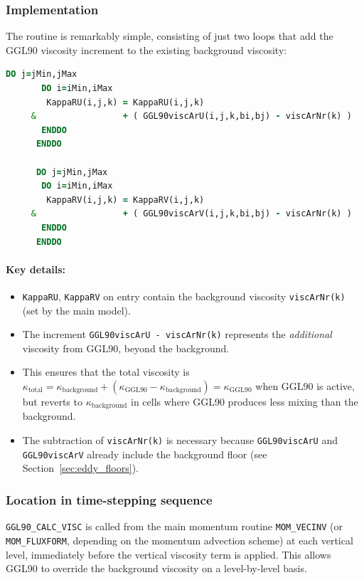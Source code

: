 \documentclass[12pt,letterpaper]{article}
\begin{document}
\subsubsection{Implementation}

The routine is remarkably simple, consisting of just two loops that add the GGL90 viscosity increment to the existing background viscosity:

\begin{lstlisting}[language=Fortran,caption={(ggl90\_calc\_visc.F:L47--59) Add GGL90 viscosity to momentum arrays}]
      DO j=jMin,jMax
       DO i=iMin,iMax
        KappaRU(i,j,k) = KappaRU(i,j,k)
     &                 + ( GGL90viscArU(i,j,k,bi,bj) - viscArNr(k) )
       ENDDO
      ENDDO

      DO j=jMin,jMax
       DO i=iMin,iMax
        KappaRV(i,j,k) = KappaRV(i,j,k)
     &                 + ( GGL90viscArV(i,j,k,bi,bj) - viscArNr(k) )
       ENDDO
      ENDDO
\end{lstlisting}

\paragraph{Key details:}
\begin{itemize}
\item \verb|KappaRU|, \verb|KappaRV| on entry contain the background viscosity \verb|viscArNr(k)| (set by the main model).
\item The increment \verb|GGL90viscArU - viscArNr(k)| represents the \emph{additional} viscosity from GGL90, beyond the background.
\item This ensures that the total viscosity is $\kappa_{\text{total}} = \kappa_{\text{background}} + (\kappa_{\text{GGL90}} - \kappa_{\text{background}}) = \kappa_{\text{GGL90}}$ when GGL90 is active, but reverts to $\kappa_{\text{background}}$ in cells where GGL90 produces less mixing than the background.
\item The subtraction of \verb|viscArNr(k)| is necessary because \verb|GGL90viscArU| and \verb|GGL90viscArV| already include the background floor (see Section~\ref{sec:eddy_floors}).
\end{itemize}

\subsubsection{Location in time-stepping sequence}

\verb|GGL90_CALC_VISC| is called from the main momentum routine \verb|MOM_VECINV| (or \verb|MOM_FLUXFORM|, depending on the momentum advection scheme) at each vertical level, immediately before the vertical viscosity term is applied. This allows GGL90 to override the background viscosity on a level-by-level basis.
\end{document}
